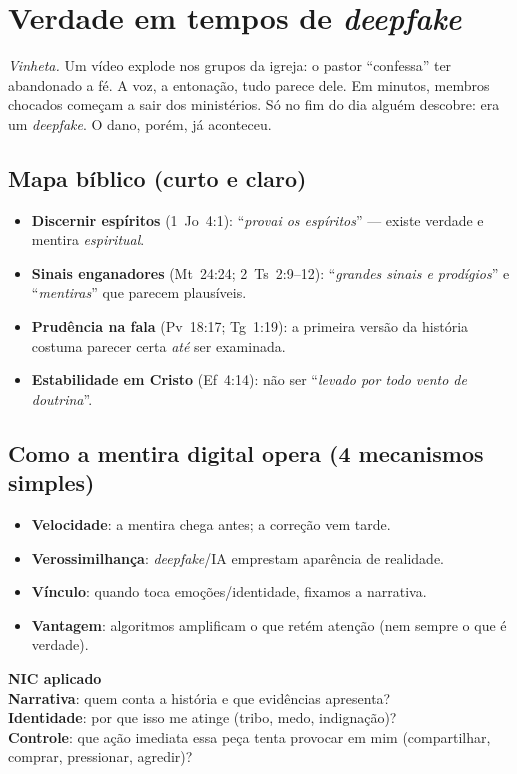 \chapter{Verdade em tempos de \textit{deepfake}}
\noindent\textit{Vinheta.} Um vídeo explode nos grupos da igreja: o pastor ``confessa'' ter abandonado a fé. A voz, a entonação, tudo parece dele. Em minutos, membros chocados começam a sair dos ministérios. Só no fim do dia alguém descobre: era um \textit{deepfake}. O dano, porém, já aconteceu.

\section{Mapa bíblico (curto e claro)}
\begin{itemize}[leftmargin=*,noitemsep]
  \item \textbf{Discernir espíritos} (1~Jo~4:1): ``\textit{provai os espíritos}'' --- existe verdade e mentira \emph{espiritual}.
  \item \textbf{Sinais enganadores} (Mt~24:24; 2~Ts~2:9--12): “\textit{grandes sinais e prodígios}” e “\textit{mentiras}” que parecem plausíveis.
  \item \textbf{Prudência na fala} (Pv~18:17; Tg~1:19): a primeira versão da história costuma parecer certa \emph{até} ser examinada.
  \item \textbf{Estabilidade em Cristo} (Ef~4:14): não ser “\textit{levado por todo vento de doutrina}”.
\end{itemize}

\section{Como a mentira digital opera (4 mecanismos simples)}
\begin{itemize}[leftmargin=*,noitemsep]
  \item \textbf{Velocidade}: a mentira chega antes; a correção vem tarde.
  \item \textbf{Verossimilhança}: \textit{deepfake}/IA emprestam aparência de realidade.
  \item \textbf{Vínculo}: quando toca emoções/identidade, fixamos a narrativa.
  \item \textbf{Vantagem}: algoritmos amplificam o que retém atenção (nem sempre o que é verdade).
\end{itemize}

\begin{nicbox}
\textbf{NIC aplicado}\\
\textbf{Narrativa}: quem conta a história e que evidências apresenta?\\
\textbf{Identidade}: por que isso me atinge (tribo, medo, indignação)?\\
\textbf{Controle}: que ação imediata essa peça tenta provocar em mim (compartilhar, comprar, pressionar, agredir)?
\end{nicbox}

